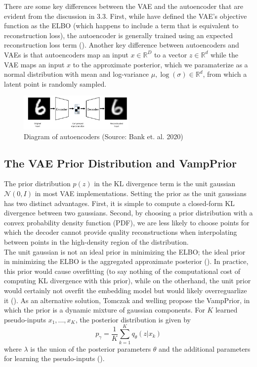 \documentclass[./dissertation.tex]{subfiles}
\begin{document}
    There are some key differences between the VAE and the autoencoder that are evident from the discussion in 3.3. First, while have defined the VAE's objective function as the ELBO (which happens to include a term that is equivalent to reconstruction loss), the autoencoder is generally trained using an expected reconstruction loss term (\cite{bank2020autoencoders}). Another key difference between autoencoders and VAEs is that autoencoders map an input $x \in \mathbb{R}^{D}$ to a vector $z \in \mathbb{R}^{d}$ while the VAE maps an input $x$ to the approximate posterior, which we paramaterize as a normal distribution with mean and log-variance $\mu, \log(\sigma) \in \mathbb{R}^{d}$, from which a latent point is randomly sampled. 
    
    \begin{figure}[h]
        \centering\includegraphics[width=0.5\textwidth]{figures/autoencoder.PNG}
        \caption{Diagram of autoencoders (Source: Bank et. al. 2020)}
        \label{Autoencoder Diagram}
    \end{figure}
    
    \subsection{The VAE Prior Distribution and VampPrior}
    The prior distribution $p(z)$ in the KL divergence term is the unit gaussian $\mathcal{N}(0, I)$ in most VAE implementations. Setting the prior as the unit gaussians has two distinct advantages. First, it is simple to compute a closed-form KL divergence between two gaussians. Second, by choosing a prior distribution with a convex probability density function (PDF), we are less likely to choose points for which the decoder cannot provide quality reconstructions when interpolating between points in the high-density region of the distribution. \\
    
    The unit gaussian is not an ideal prior in minimizing the ELBO; the ideal prior in minimizing the ELBO is the aggregated approximate posterior (\cite{tomczak2018vae}). In practice, this prior would cause overfitting (to say nothing of the computational cost of computing KL divergence with this prior), while on the otherhand, the unit prior would certainly not overfit the embedding model but would likely overreguarlize it (\cite{tomczak2018vae}). As an alternative solution, Tomczak and welling propose the VampPrior, in which the prior is a dynamic mixture of gaussian components. For $K$ learned pseudo-inputs $x_{1},...,x_{K}$, the posterior distribution is given by
    \begin{equation*}
        p_{\gamma}=\frac{1}{K}
        \sum_{k=1}^{K}
        q_{\theta}(z|x_{k})
    \end{equation*}
    where $\lambda$ is the union of the posterior parameters $\theta$ and the additional parameters for learning the pseudo-inputs (\cite{tomczak2018vae}).

    
\end{document}
